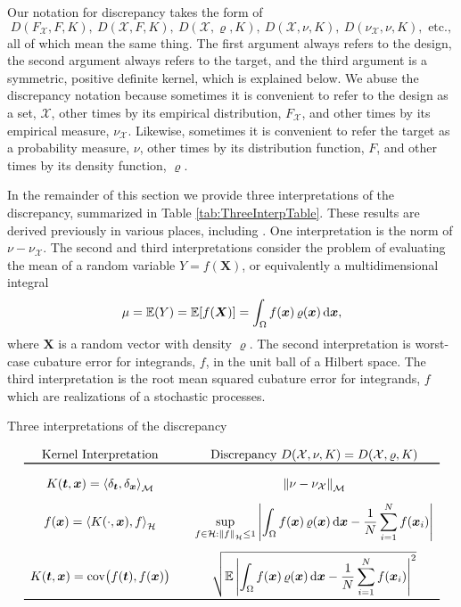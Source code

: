 \documentclass[graybox]{svmult}
\newcommand{\vx}{\boldsymbol{x}}
\newcommand{\vX}{\boldsymbol{X}}
\newcommand{\vt}{\boldsymbol{t}}
\newcommand{\dif}{{\rm d}}
\newcommand{\Xdes}{\mathcal{X}}
\newcommand{\cm}{\mathcal{M}}
\newcommand{\ch}{\mathcal{H}}
\newcommand{\Ex}{\mathbb{E}}
\newcommand{\ip}[3][{}]{\ensuremath{\left \langle #2, #3 \right \rangle_{#1}}}
\newcommand{\norm}[2][{}]{\ensuremath{\left \lVert #2 \right \rVert}_{#1}}
\DeclareMathOperator{\cov}{cov}
\def\abs#1{\ensuremath{\left \lvert #1 \right \rvert}}
\begin{document}
Our notation for discrepancy takes the form of 
\[
 D(F_{\Xdes},F,K), \ D(\Xdes,F,K), \ D(\Xdes,\varrho,K), \ D(\Xdes,\nu,K), \ D(\nu_{\Xdes},\nu,K), \text{ etc.}, 
\]
all of which mean the same thing.  The first argument always refers to the design, the second argument always refers to the target, and the third argument is a symmetric, positive definite kernel, which is explained below.  We abuse the discrepancy notation because sometimes it is convenient to refer to the design as a set, $\Xdes$, other times by its empirical distribution, $F_{\Xdes}$, and other times by its empirical measure, $\nu_{\Xdes}$.  Likewise, sometimes it is convenient to refer the target as a probability measure,  $\nu$, other times by its distribution function, $F$, and other times by its density function, $\varrho$.

In the remainder of this section we provide three interpretations of the discrepancy, summarized in Table \ref{tab:ThreeInterpTable}.  These results are derived previously in various places, including \cite{Hic99a}.  One interpretation is the norm of $\nu - \nu_{\Xdes}$.  The second and third interpretations consider the problem of evaluating the mean of a random variable $Y=f(\vX)$, or equivalently a multidimensional integral
\begin{equation}\label{eq:integration}
\mu = \Ex(Y) = \Ex[f(\vX)] = \int_{\Omega} f(\vx) \, \varrho(\vx) \, \dif \vx,
\end{equation}
where $\vX$ is a random vector with density $\varrho$. The second
interpretation is worst-case cubature error for integrands, $f$, in the unit ball of a Hilbert space.  The third interpretation is the root mean squared cubature error for integrands, $f$ which are realizations of a stochastic processes.

\begin{table}
\centering
\caption{Three interpretations of the discrepancy}
\vspace{-3ex}
\begin{equation*}
\begin{array}{c@{\qquad}ccc}
\text{Kernel Interpretation} & \text{Discrepancy } D(\Xdes,\nu,K) = D(\Xdes,\varrho,K)\\
\toprule \\[-1ex]
K(\vt,\vx) = \ip[\cm]{\delta_{\vt}}{\delta_{\vx}} & \norm[\cm]{\nu - \nu_{\Xdes}} \\[2ex]
f(\vx) = \ip[\ch]{K(\cdot,\vx)}{f} & \displaystyle \sup_{f \in \ch : \norm[\ch]{f} \le 1} \abs{\int_{\Omega} f(\vx) \, \varrho(\vx) \, \dif \vx - \frac 1N \sum_{i=1}^N f(\vx_i)}\\[4ex]
K(\vt,\vx) = \cov\bigl(f(\vt), f(\vx) \bigr) & \displaystyle \sqrt{\Ex \abs{\int_{\Omega} f(\vx) \, \varrho(\vx) \, \dif \vx - \frac 1N \sum_{i=1}^N f(\vx_i)}^2}\\\bottomrule
\end{array}
\end{equation*}
\label{tab:ThreeInterpTable}
\end{table}
\end{document}
